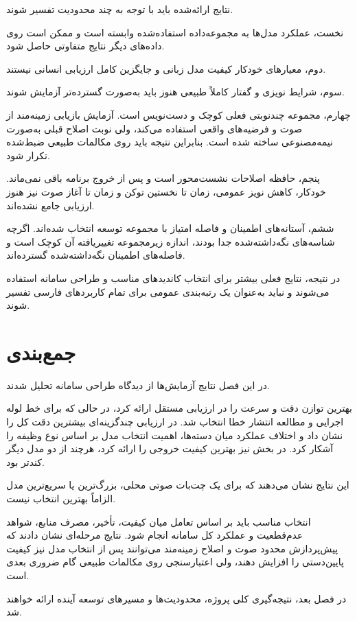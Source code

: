 نتایج ارائه‌شده باید با توجه به چند محدودیت تفسیر شوند.

نخست، عملکرد مدل‌ها به مجموعه‌داده استفاده‌شده وابسته است و
ممکن است روی داده‌های دیگر نتایج متفاوتی حاصل شود.

دوم، معیارهای خودکار کیفیت مدل زبانی و  جایگزین کامل
ارزیابی انسانی نیستند.

سوم، شرایط نویزی و گفتار کاملاً طبیعی هنوز باید به‌صورت
گسترده‌تر آزمایش شوند.

چهارم، مجموعه چندنوبتی فعلی کوچک و دست‌نویس است. آزمایش بازیابی
زمینه‌مند از صوت و فرضیه‌های واقعی استفاده می‌کند، ولی نوبت اصلاح
قبلی به‌صورت نیمه‌مصنوعی ساخته شده است. بنابراین نتیجه باید روی
مکالمات طبیعی ضبط‌شده تکرار شود.

پنجم، حافظه اصلاحات نشست‌محور است و پس از خروج برنامه باقی
نمی‌ماند.  خودکار، کاهش نویز عمومی، زمان تا نخستین توکن و
زمان تا آغاز صوت نیز هنوز ارزیابی جامع نشده‌اند.

ششم، آستانه‌های اطمینان و فاصله امتیاز با مجموعه توسعه انتخاب
شده‌اند. اگرچه شناسه‌های نگه‌داشته‌شده جدا بودند، اندازه زیرمجموعه
تغییریافته آن کوچک است و فاصله‌های اطمینان نگه‌داشته‌شده گسترده‌اند.

در نتیجه، نتایج فعلی بیشتر برای انتخاب کاندیدهای مناسب و
طراحی سامانه استفاده می‌شوند و نباید به‌عنوان یک رتبه‌بندی
عمومی برای تمام کاربردهای فارسی تفسیر شوند.


\section{جمع‌بندی}

در این فصل نتایج آزمایش‌ها از دیدگاه طراحی سامانه تحلیل شدند.

 بهترین توازن دقت و سرعت را در ارزیابی مستقل
 ارائه کرد، در حالی که  برای خط لوله
اجرایی و مطالعه انتشار خطا انتخاب شد.
 در ارزیابی چندگزینه‌ای  بیشترین دقت کل
را نشان داد و اختلاف عملکرد میان دسته‌ها، اهمیت انتخاب مدل بر اساس
نوع وظیفه را آشکار کرد.
در بخش  نیز  بهترین کیفیت خروجی را ارائه کرد، هرچند
از دو مدل دیگر کندتر بود.

این نتایج نشان می‌دهند که برای یک چت‌بات صوتی محلی، بزرگ‌ترین
یا سریع‌ترین مدل الزاماً بهترین انتخاب نیست.

انتخاب مناسب باید بر اساس تعامل میان کیفیت، تأخیر، مصرف منابع،
شواهد عدم‌قطعیت و عملکرد کل سامانه انجام شود. نتایج مرحله‌ای نشان
دادند که پیش‌پردازش محدود صوت و اصلاح زمینه‌مند می‌توانند پس از
انتخاب مدل نیز کیفیت پایین‌دستی را افزایش دهند، ولی اعتبارسنجی
روی مکالمات طبیعی گام ضروری بعدی است.

در فصل بعد، نتیجه‌گیری کلی پروژه، محدودیت‌ها و مسیرهای توسعه
آینده ارائه خواهند شد.
